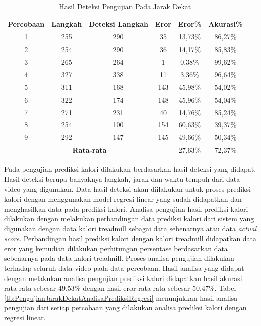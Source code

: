 \begin{longtable}{|c|c|c|c|c|c|}
  \caption{Hasil Deteksi Pengujian Pada Jarak Dekat}
  \label{tb:PengujianJarakDekatAnalisaDeteksi}                                   \\
  \hline
  \rowcolor[HTML]{C0C0C0}
  \textbf{Percobaan} & \textbf{Langkah} & \textbf{Deteksi Langkah} & \textbf{Eror} & \textbf{Eror\%} & \textbf{Akurasi\%} \\
  \hline
  1   & 255   & 290  & 35  & 13,73\%    & 86,27\%   \\
  \hline
  2   & 254   & 290  & 36  & 14,17\%    & 85,83\%   \\
  \hline
  3   & 265   & 264  & 1   & 0,38\%     & 99,62\%   \\
  \hline
  4   & 327   & 338  & 11  & 3,36\%     & 96,64\%   \\
  \hline
  5   & 311   & 168  & 143 & 45,98\%    & 54,02\%   \\
  \hline
  6   & 322   & 174  & 148 & 45,96\%    & 54,04\%   \\
  \hline
  7   & 271   & 231  & 40  & 14,76\%    & 85,24\%   \\
  \hline
  8   & 254   & 100  & 154 & 60,63\%    & 39,37\%   \\
  \hline
  9   & 292   & 147  & 145 & 49,66\%    & 50,34\%   \\
  \hline

  \multicolumn{4}{|c|}{\textbf{Rata-rata}} & 27,63\% & 72,37\% \\
  \hline
\end{longtable}

Pada pengujian prediksi kalori dilakukan berdasarkan hasil deteksi yang didapat. Hasil deteksi berupa banyaknya langkah, jarak dan waktu tempuh dari data video yang digunakan. Data hasil deteksi akan diilakukan untuk proses prediksi kalori dengan menggunakan model regresi linear yang sudah didapatkan dan menghasilkan data pada prediksi kalori. Analisa pengujian hasil prediksi kalori dilakukan dengan melakukan perbandingan data prediksi kalori dari sistem yang digunakan dengan data kalori treadmill sebagai data sebenarnya atau data \emph{actual score}. Perbandingan hasil prediksi kalori dengan kalori treadmill didapatkan data eror yang kemudian dilakukan perhitungan persentase berdasarkan data sebenarnya pada data kalori treadmill. Proses analisa pengujian dilakukan terhadap seluruh data video pada data percobaan. Hasil analisa yang didapat dengan melakukan analisa pengujian prediksi kalori didapatkan hasil akurasi rata-rata sebesar 49,53\% dengan hasil eror rata-rata sebesar 50,47\%. Tabel \ref{tb:PengujianJarakDekatAnalisaPrediksiRegresi} menunjukkan hasil analisa pengujian dari setiap percobaan yang dilakukan analisa prediksi kalori dengan regresi linear.

